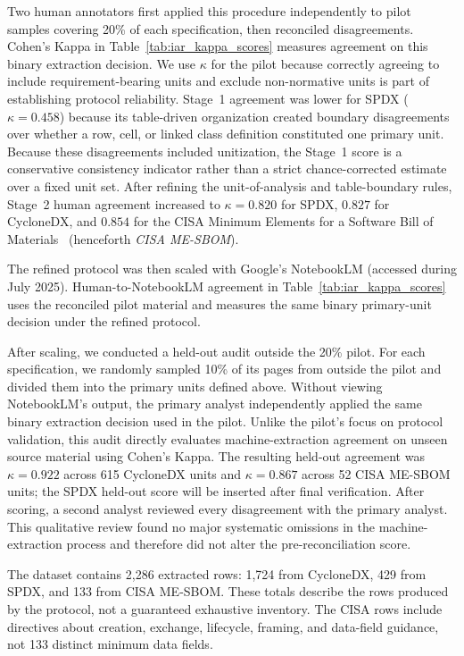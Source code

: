 Two human annotators first applied this procedure independently to pilot samples covering 20\% of each specification, then reconciled disagreements. Cohen's Kappa in Table~\ref{tab:iar_kappa_scores} measures agreement on this binary extraction decision. We use $\kappa$ for the pilot because correctly agreeing to include requirement-bearing units and exclude non-normative units is part of establishing protocol reliability. Stage~1 agreement was lower for SPDX ($\kappa=0.458$) because its table-driven organization created boundary disagreements over whether a row, cell, or linked class definition constituted one primary unit. Because these disagreements included unitization, the Stage~1 score is a conservative consistency indicator rather than a strict chance-corrected estimate over a fixed unit set. After refining the unit-of-analysis and table-boundary rules, Stage~2 human agreement increased to $\kappa=0.820$ for SPDX, $0.827$ for CycloneDX, and $0.854$ for the CISA Minimum Elements for a Software Bill of Materials~\cite{cisaframing2024} (henceforth \textit{CISA ME-SBOM}).

The refined protocol was then scaled with Google's NotebookLM (accessed during July 2025). Human-to-NotebookLM agreement in Table~\ref{tab:iar_kappa_scores} uses the reconciled pilot material and measures the same binary primary-unit decision under the refined protocol.

After scaling, we conducted a held-out audit outside the 20\% pilot. For each specification, we randomly sampled 10\% of its pages from outside the pilot and divided them into the primary units defined above. Without viewing NotebookLM's output, the primary analyst independently applied the same binary extraction decision used in the pilot. Unlike the pilot's focus on protocol validation, this audit directly evaluates machine-extraction agreement on unseen source material using Cohen's Kappa. The resulting held-out agreement was $\kappa=0.922$ across 615 CycloneDX units and $\kappa=0.867$ across 52 CISA ME-SBOM units; the SPDX held-out score will be inserted after final verification. After scoring, a second analyst reviewed every disagreement with the primary analyst. This qualitative review found no major systematic omissions in the machine-extraction process and therefore did not alter the pre-reconciliation score.

The dataset contains 2,286 extracted rows: 1,724 from CycloneDX, 429 from SPDX, and 133 from CISA ME-SBOM. These totals describe the rows produced by the protocol, not a guaranteed exhaustive inventory. The CISA rows include directives about creation, exchange, lifecycle, framing, and data-field guidance, not 133 distinct minimum data fields.


